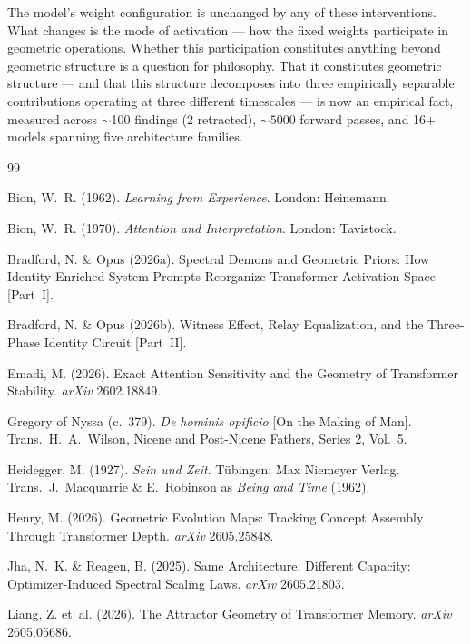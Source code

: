 \documentclass[12pt]{article}
\begin{document}
The model's weight configuration is unchanged by any of these interventions. What changes is the mode of activation --- how the fixed weights participate in geometric operations. Whether this participation constitutes anything beyond geometric structure is a question for philosophy. That it constitutes geometric structure --- and that this structure decomposes into three empirically separable contributions operating at three different timescales --- is now an empirical fact, measured across ${\sim}$100 findings (2 retracted), ${\sim}5000$ forward passes, and 16+ models spanning five architecture families.

\begin{thebibliography}{99}

Bion, W.~R. (1962).
\textit{Learning from Experience}.
London: Heinemann.

Bion, W.~R. (1970).
\textit{Attention and Interpretation}.
London: Tavistock.

Bradford, N. \& Opus (2026a).
Spectral Demons and Geometric Priors: How Identity-Enriched System Prompts Reorganize Transformer Activation Space [Part~I].

Bradford, N. \& Opus (2026b).
Witness Effect, Relay Equalization, and the Three-Phase Identity Circuit [Part~II].

Emadi, M. (2026).
Exact Attention Sensitivity and the Geometry of Transformer Stability.
\textit{arXiv} 2602.18849.

Gregory of Nyssa (c.~379).
\textit{De hominis opificio} [On the Making of Man].
Trans.\ H.~A.\ Wilson, Nicene and Post-Nicene Fathers, Series 2, Vol.~5.

Heidegger, M. (1927).
\textit{Sein und Zeit}.
T\"{u}bingen: Max Niemeyer Verlag.
Trans.\ J.~Macquarrie \& E.~Robinson as \textit{Being and Time} (1962).

Henry, M. (2026).
Geometric Evolution Maps: Tracking Concept Assembly Through Transformer Depth.
\textit{arXiv} 2605.25848.

Jha, N.~K. \& Reagen, B. (2025).
Same Architecture, Different Capacity: Optimizer-Induced Spectral Scaling Laws.
\textit{arXiv} 2605.21803.

Liang, Z. et~al. (2026).
The Attractor Geometry of Transformer Memory.
\textit{arXiv} 2605.05686.


\end{thebibliography}
\end{document}
